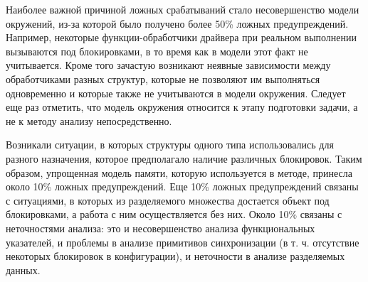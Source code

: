 Наиболее важной причиной ложных срабатываний стало несовершенство модели окружений, из-за которой было  получено  более  50\%  ложных  предупреждений.
Например,  некоторые функции-обработчики  драйвера  при  реальном  выполнении  вызываются  под блокировками, в то время как в модели этот факт не учитывается.
Кроме того зачастую  возникают  неявные  зависимости  между  обработчиками  разных структур,  которые  не  позволяют  им  выполняться одновременно  и  которые также  не  учитываются  в  модели  окружения.
Следует  еще  раз  отметить, что модель окружения относится к этапу подготовки задачи, а не к методу анализу непосредственно. 

Возникали  ситуации,  в  которых  структуры  одного  типа  использовались  для разного  назначения,  которое  предполагало  наличие  различных  блокировок. 
Таким образом, упрощенная модель памяти, которую используется в методе, принесла около 10\% ложных предупреждений. 
Еще 10\%  ложных  предупреждений  связаны  с  ситуациями,  в  которых  из разделяемого множества достается объект под блокировками, а работа с ним 
осуществляется  без них.
Около 10\% связаны с  неточностями анализа: это и несовершенство анализа функциональных указателей, и проблемы в анализе примитивов  синхронизации  (в т. ч. отсутствие некоторых  блокировок  в конфигурации), и неточности в анализе разделяемых данных.  

